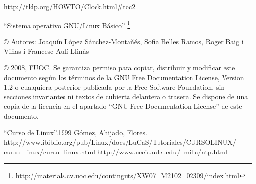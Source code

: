 \documentclass[12pt]{article}
\begin{document}
http://tldp.org/HOWTO/Clock.html\#toc2

``Sistema operativo GNU/Linux Básico'' \footnote{http://materials.cv.uoc.edu/continguts/XW07\_M2102\_02309/index.html}

© Autores: Joaquín López Sánchez-Montañés, Sofia Belles Ramos, Roger Baig i Viñas i Francesc Aulí Llinàs

© 2008, FUOC. Se garantiza permiso para copiar, distribuir y modificar este documento según los
términos de la GNU Free Documentation License, Version 1.2 o cualquiera posterior publicada por la
Free Software Foundation, sin secciones invariantes ni textos de cubierta delantera o trasera. Se dispone
de una copia de la licencia en el apartado ``GNU Free Documentation License'' de este documento.

\begin{thebibliography}{1}
 ``Curso de Linux''.1999 Gómez, Ahijado, Flores.\\ 
http://www.ibiblio.org/pub/Linux/docs/LuCaS/Tutoriales/CURSOLINUX/\\curso\_linux/curso\_linux.html
http://www.eecis.udel.edu/~mills/ntp.html
\end{thebibliography}
\end{document}
